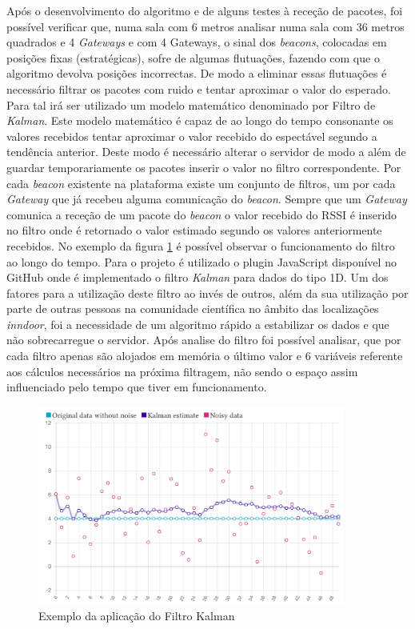 \par Após o desenvolvimento do algoritmo e de alguns testes à receção de pacotes, foi possível verificar que, numa sala com 6 metros analisar numa sala com 36 metros quadrados e 4 \textit{Gateways} e com 4 Gateways, o sinal dos \textit{beacons}, colocadas em posições fixas (estratégicas), sofre de algumas flutuações, fazendo com que o algoritmo devolva posições incorrectas. De modo a eliminar essas flutuações é necessário filtrar os pacotes com ruido e tentar aproximar o valor do esperado. Para tal irá ser utilizado um modelo matemático denominado por Filtro de \textit{Kalman}\cite{KalmanFilter2}. Este modelo matemático é capaz de ao longo do tempo consonante os valores recebidos tentar aproximar o valor recebido do espectável segundo a tendência anterior. Deste modo é necessário alterar o servidor de modo a além de guardar temporariamente os pacotes inserir o valor no filtro correspondente. Por cada \textit{beacon} existente na plataforma existe um conjunto de filtros, um por cada \textit{Gateway} que já recebeu alguma comunicação do \textit{beacon}. Sempre que um \textit{Gateway} comunica a receção de um pacote do \textit{beacon} o valor recebido do RSSI é inserido no filtro onde é retornado o valor estimado segundo os valores anteriormente recebidos. No exemplo da figura \ref{kalman1} é possível observar o funcionamento do filtro ao longo do tempo. Para o projeto é utilizado o plugin JavaScript\cite{kalman} disponível no GitHub onde é implementado o filtro \textit{Kalman} para dados do tipo 1D. Um dos fatores para a utilização deste filtro ao invés de outros, além da sua utilização por parte de outras pessoas na comunidade científica no âmbito das localizações \textit{inndoor}, foi a necessidade de um algoritmo rápido a estabilizar os dados e que não sobrecarregue o servidor. Após analise do filtro foi possível analisar, que por cada filtro apenas são alojados em memória o último valor e 6 variáveis referente aos cálculos necessários na próxima filtragem, não sendo o espaço assim influenciado pelo tempo que tiver em funcionamento.

\begin{figure}[ht]
\centering
\includegraphics[width=0.90\textwidth]{images/kalman-example.png}
\caption{Exemplo da aplicação do Filtro Kalman \cite{kalman}}\label{kalman1}
\end{figure}



